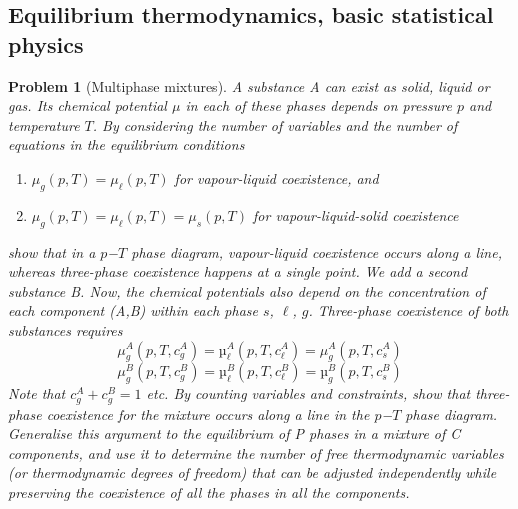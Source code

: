 \documentclass[a4paper]{article}
\theoremstyle{new}
\newtheorem{qns}{Problem}[section]
\begin{document}
\subsection*{Equilibrium thermodynamics, basic statistical physics}
\begin{qns}[Multiphase mixtures]
A substance A can exist as solid, liquid or gas. Its chemical potential $\mu$ in each of these phases depends on pressure $p$ and temperature $T$. By considering the number of variables and the number of equations in the equilibrium conditions
\begin{enumerate}[label=\roman*]
\item $\mu_g(p,T)=\mu_\ell(p,T)$ for vapour-liquid coexistence, and
\item $\mu_g(p,T)=\mu_\ell(p,T)=\mu_s(p,T)$ for vapour-liquid-solid coexistence
\end{enumerate}
show that in a $p$−$T$ phase diagram, vapour-liquid coexistence occurs along a line, whereas three-phase coexistence happens at a single point. We add a second substance B. Now, the chemical potentials also depend on the concentration of each component (A,B) within each phase $s$, $\ell$, $g$. Three-phase coexistence of both substances requires
$$\mu^A_g (p,T,c^A_g ) = µ^A_\ell (p,T,c^A_\ell ) = \mu^A_g (p,T,c^A_s )$$
$$\mu^B_g (p,T,c^B_g ) = µ^B_\ell (p,T,c^B_\ell ) = µ^B_g (p,T,c^B_s)$$
Note that $c^A_g + c^B_g = 1$ etc. By counting variables and constraints, show that three-phase coexistence for the mixture occurs along a line in the $p$−$T$ phase diagram.\\[5pt]
Generalise this argument to the equilibrium of P phases in a mixture of C components, and use it to determine the number of free thermodynamic variables (or thermodynamic degrees of freedom) that can be adjusted independently while preserving the coexistence of all the phases in all the components.
\end{qns}
\end{document}
